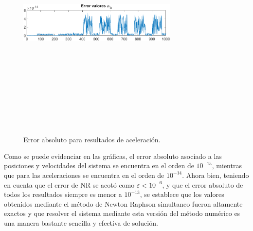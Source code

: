 \documentclass[12pt]{article}
\begin{document}
        \vspace{-25pt}
        \begin{figure} [H]
        \centerline{\includegraphics[width=8cm, height=12cm,keepaspectratio]{Error/Error alpha3.png}}
        \caption{Error absoluto para resultados de aceleración.}
        \label{}
    \end{figure}
Como se puede evidenciar en las gráficas, el error absoluto asociado a las posiciones y velocidades del sistema se encuentra en el orden de $10^{-15}$, mientras que para las aceleraciones se encuentra en el orden de $10^{-14}$. Ahora bien, teniendo en cuenta que el error de NR se acotó como $\varepsilon<10^{-6}$, y que el error absoluto de todos los resultados siempre es menor a $10^{-13}$, se establece que los valores obtenidos mediante el método de Newton Raphson simultaneo fueron altamente exactos y que resolver el sistema mediante esta versión del método numérico es una manera bastante sencilla y efectiva de solución.
\end{document}
